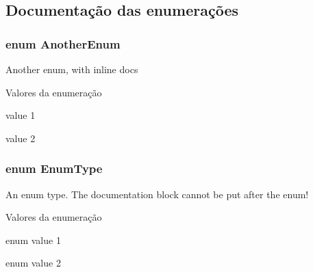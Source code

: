\subsection{Documentação das enumerações}
\hypertarget{class_test_a34ccf30f7cd970ac542d71619b2647f1}{
\subsubsection[{Another\-Enum}]{\setlength{\rightskip}{0pt plus 5cm}enum {\bf Another\-Enum}}}\label{class_test_a34ccf30f7cd970ac542d71619b2647f1}
Another enum, with inline docs \begin{Desc}
\item[Valores da enumeração]\par
\begin{description}
\item[{\em 
\hypertarget{class_test_a34ccf30f7cd970ac542d71619b2647f1ae307daa999bfd69743cd368d6d372c82}{V1}\label{class_test_a34ccf30f7cd970ac542d71619b2647f1ae307daa999bfd69743cd368d6d372c82}
}]value 1 \item[{\em 
\hypertarget{class_test_a34ccf30f7cd970ac542d71619b2647f1a3e329bb4aa8def056d4ae1e93751a652}{V2}\label{class_test_a34ccf30f7cd970ac542d71619b2647f1a3e329bb4aa8def056d4ae1e93751a652}
}]value 2 \end{description}
\end{Desc}
\hypertarget{class_test_a20912c6b82fc0ee7d195d2468f1b2ff2}{
\subsubsection[{Enum\-Type}]{\setlength{\rightskip}{0pt plus 5cm}enum {\bf Enum\-Type}}}\label{class_test_a20912c6b82fc0ee7d195d2468f1b2ff2}
An enum type. The documentation block cannot be put after the enum! \begin{Desc}
\item[Valores da enumeração]\par
\begin{description}
\item[{\em 
\hypertarget{class_test_a20912c6b82fc0ee7d195d2468f1b2ff2a8fc935f8d352ba9f6d53ea29b6c5af49}{E\-Val1}\label{class_test_a20912c6b82fc0ee7d195d2468f1b2ff2a8fc935f8d352ba9f6d53ea29b6c5af49}
}]enum value 1 \item[{\em 
\hypertarget{class_test_a20912c6b82fc0ee7d195d2468f1b2ff2a988694809f6d25c498ed7ce246110a2c}{E\-Val2}\label{class_test_a20912c6b82fc0ee7d195d2468f1b2ff2a988694809f6d25c498ed7ce246110a2c}
}]enum value 2 \end{description}
\end{Desc}

